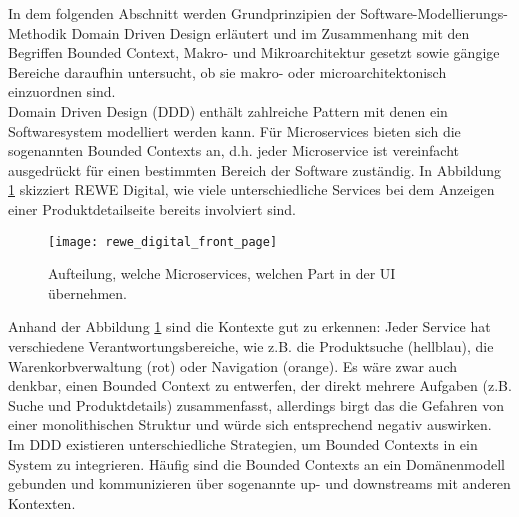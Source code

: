 In dem folgenden Abschnitt werden Grundprinzipien der Software-Modellierungs-Methodik Domain Driven Design erläutert und im Zusammenhang mit den Begriffen Bounded Context, Makro- und Mikroarchitektur gesetzt sowie gängige Bereiche daraufhin untersucht, ob sie makro- oder microarchitektonisch einzuordnen sind.\\

Domain Driven Design (DDD) enthält zahlreiche Pattern mit denen ein Softwaresystem modelliert werden kann. Für Microservices bieten sich die sogenannten Bounded Contexts an, d.h. jeder Microservice ist vereinfacht ausgedrückt für einen bestimmten Bereich der Software zuständig. In Abbildung \ref{fig:rewe_microservice_ui} skizziert REWE Digital, wie viele unterschiedliche Services bei dem Anzeigen einer Produktdetailseite bereits involviert sind.\\ 

\begin{figure}[ht]
	\centering
	\texttt{[image: rewe\_digital\_front\_page]}
	\caption{Aufteilung, welche Microservices, welchen Part in der UI übernehmen.\cite{rewe2019mic_ppp}}
	\label{fig:rewe_microservice_ui}
\end{figure}

Anhand der Abbildung \ref{fig:rewe_microservice_ui} sind die Kontexte gut zu erkennen: Jeder Service hat verschiedene Verantwortungsbereiche, wie z.B. die Produktsuche (hellblau), die Warenkorbverwaltung (rot) oder Navigation (orange). Es wäre zwar auch denkbar, einen Bounded Context zu entwerfen, der direkt mehrere Aufgaben (z.B. Suche und Produktdetails) zusammenfasst, allerdings birgt das die Gefahren von einer monolithischen Struktur und würde sich entsprechend negativ auswirken.\\

Im DDD existieren unterschiedliche Strategien, um Bounded Contexts in ein System zu integrieren. Häufig sind die Bounded Contexts an ein Domänenmodell gebunden und kommunizieren über sogenannte up- und downstreams mit anderen Kontexten.\\

